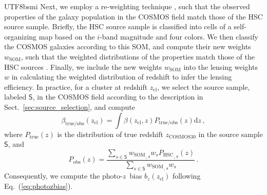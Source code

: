 \documentclass[longauth]{aa}
\newcommand{\redshift}{\ensuremath{z}}
\newcommand{\dif}{\ensuremath{\mathrm{d}}}
\newcommand{\zcl}{\ensuremath{z_{\mathrm{cl}}}}
\newcommand{\lensingw}{\ensuremath{w}}
\newcommand{\bz}{\ensuremath{b_{z}}}
\newcommand{\lensingeff}{\ensuremath{\beta}}
\begin{document}
\begin{CJK*}{UTF8}{bsmi}
Next, we employ a re-weighting technique \citep[for more details and some caveats of this method, see ][]{bonnett16,gruen17,hikage19}, such that the observed properties of the galaxy population in the COSMOS field match those of the HSC source sample.
Briefly, the HSC source sample is classified into cells of a self-organizing map \citep[SOM;][]{masters15} based on the $i$-band magnitude and four colors.
We then classify the COSMOS galaxies according to this SOM, and compute their new weights $w_{\mathrm{SOM}}$, such that the weighted distributions of the properties match those of the HSC sources \citep[see also][]{medezinski18a}.
Finally, we include the new weights $w_{\mathrm{SOM}}$ into the lensing weights $w$ in calculating the weighted distribution of redshift to infer the lensing efficiency.
In practice, for a cluster at redshift \zcl, we select the source sample, labeled $\mathsf{S}$, in the COSMOS field according to the description in Sect.~\ref{sec:source_selection}, and compute
%
\begin{equation}
\label{eq:photozbias_2}
{\lensingeff}_{\mathrm{true}/\mathrm{obs}}(\zcl) = 
\int
\lensingeff\left(\zcl,\redshift \right)
P_{\mathrm{true}/\mathrm{obs}}
\left({\redshift}\right)
\dif{\redshift}
\, ,
\end{equation}
%
where $P_{\mathrm{true}}(\redshift)$ is the distribution of true redshift ${\redshift}_{\mathrm{COSMOS30}}$ in the source sample $\mathsf{S}$, and 
%
\begin{equation}
\label{eq:photozbias_3}
P_{\mathrm{obs}}
\left(\redshift\right)
 = 
\frac{
\sum\limits_{s \in \mathsf{S}} {w_{\mathrm{SOM}}}_{,s}{\lensingw}_{s} {P_{\mathrm{HSC}}}_{,s}\left(\redshift\right)
}{
\sum\limits_{s \in \mathsf{S}} {w_{\mathrm{SOM}}}_{,s}{\lensingw}_{s}
} \, .
\end{equation}
%
Consequently, we compute the photo-\redshift\ bias $\bz(\zcl)$ following Eq.~(\ref{eq:photozbias}).


\end{CJK*}
\end{document}
